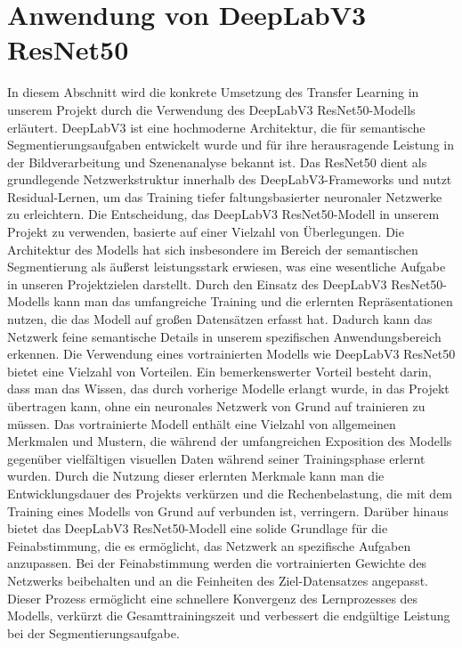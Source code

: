\section{Anwendung von DeepLabV3 ResNet50}

    In diesem Abschnitt wird die konkrete Umsetzung des Transfer Learning in unserem Projekt durch die Verwendung des DeepLabV3 ResNet50-Modells erläutert.
    DeepLabV3 ist eine hochmoderne Architektur, die für semantische Segmentierungsaufgaben entwickelt wurde und für ihre herausragende Leistung in der Bildverarbeitung und Szenenanalyse bekannt ist.
    Das ResNet50 dient als grundlegende Netzwerkstruktur innerhalb des DeepLabV3-Frameworks und nutzt Residual-Lernen, um das Training tiefer faltungs­basierter neuronaler Netzwerke zu erleichtern.
    Die Entscheidung, das DeepLabV3 ResNet50-Modell in unserem Projekt zu verwenden, basierte auf einer Vielzahl von Überlegungen.
    Die Architektur des Modells hat sich insbesondere im Bereich der semantischen Segmentierung als äußerst leistungsstark erwiesen, was eine wesentliche Aufgabe in unseren Projektzielen darstellt.
    Durch den Einsatz des DeepLabV3 ResNet50-Modells kann man das umfangreiche Training und die erlernten Repräsentationen nutzen, die das Modell auf großen Datensätzen erfasst hat.
    Dadurch kann das Netzwerk feine semantische Details in unserem spezifischen Anwendungsbereich erkennen.
    Die Verwendung eines vortrainierten Modells wie DeepLabV3 ResNet50 bietet eine Vielzahl von Vorteilen.
    Ein bemerkenswerter Vorteil besteht darin, dass man das Wissen, das durch vorherige Modelle erlangt wurde, in das Projekt übertragen kann, ohne ein neuronales Netzwerk von Grund auf trainieren zu müssen.
    Das vortrainierte Modell enthält eine Vielzahl von allgemeinen Merkmalen und Mustern, die während der umfangreichen Exposition des Modells gegenüber vielfältigen visuellen Daten während seiner Trainingsphase erlernt wurden.
    Durch die Nutzung dieser erlernten Merkmale kann man die Entwicklungsdauer des Projekts verkürzen und die Rechenbelastung, die mit dem Training eines Modells von Grund auf verbunden ist, verringern.
    Darüber hinaus bietet das DeepLabV3 ResNet50-Modell eine solide Grundlage für die Feinabstimmung, die es ermöglicht, das Netzwerk an spezifische Aufgaben anzupassen.
    Bei der Feinabstimmung werden die vortrainierten Gewichte des Netzwerks beibehalten und an die Feinheiten des Ziel-Datensatzes angepasst.
    Dieser Prozess ermöglicht eine schnellere Konvergenz des Lernprozesses des Modells, verkürzt die Gesamttrainingszeit und verbessert die endgültige Leistung bei der Segmentierungsaufgabe.
